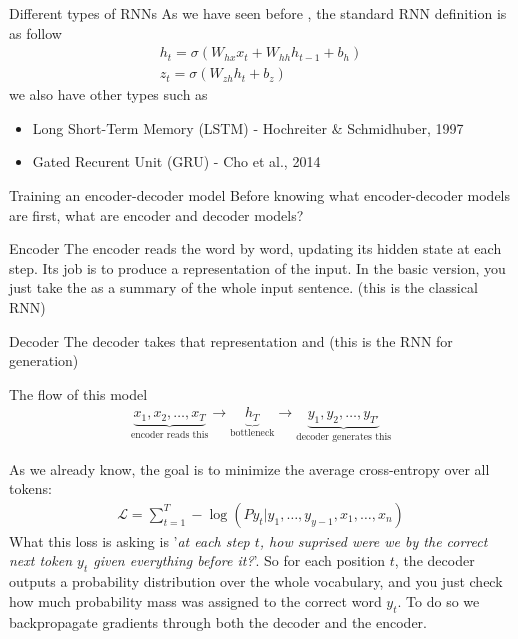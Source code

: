 \begin{parag}{Different types of RNNs}
    As we have seen before , the standard RNN definition is as follow 
	\begin{align*} 
		h_t = \sigma\left(W_{hx}x_t + W_{hh}h_{t-1} + b_h\right)\\
		z_t = \sigma\left(W_{zh}h_t + b_z\right)
	\end{align*}
	we also have other types such as 
	\begin{itemize}
		\item Long Short-Term Memory (LSTM) - Hochreiter \& Schmidhuber, 1997
		\item Gated Recurent Unit (GRU) - Cho et al., 2014
	\end{itemize}
	
\end{parag}


\begin{parag}{Training an encoder-decoder model}
	Before knowing what encoder-decoder models are first, what are encoder and decoder models?
	\begin{subparag}{Encoder}
	    The encoder reads the  word by word, updating its hidden state at each step. Its job is to produce a representation of the input. In the basic version, you just take the  as a summary of the whole input sentence. (this is the classical RNN)
	\end{subparag}
	\begin{subparag}{Decoder}
	    The decoder takes that representation and  (this is the RNN for generation)
	\end{subparag}
	The flow of this model 
	\begin{align*} 
		\underbrace{x_1, x_2, \ldots, x_T}_{\text{encoder reads this}} \to \underbrace{h_T}_{\text{bottleneck}} \to \underbrace{y_1, y_2, \ldots, y_{T'}}_{\text{decoder generates this}}
	\end{align*}

    As we already know, the goal is to minimize the average cross-entropy over all tokens:
	\begin{align*} 
		\mathcal{L} =  \sum_{t= 1}^{T} - \log\left(Py_t | y_1, \ldots, y_{y-1}, x_1, \ldots, x_n\right)
	\end{align*}
	What this loss is asking is '\textit{at each step $t$, how suprised were we by the correct next token $y_t$ given everything before it?}'. So for each position $t$, the decoder outputs a probability distribution over the whole vocabulary, and you just check how much probability mass was assigned to the correct word $y_t$.
	To do so we backpropagate gradients through both the decoder and the encoder.
\end{parag}

